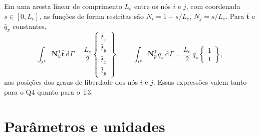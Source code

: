 \documentclass[11pt,a4paper]{article}
\newcommand{\dd}{\mathrm{d}}
\begin{document}
Em uma aresta linear de comprimento $L_e$ entre os nós $i$ e $j$, com
coordenada $s\in[0,L_e]$, as funções de forma restritas são
$N_i=1-s/L_e$, $N_j=s/L_e$. Para $\bar{\mathbf t}$ e $\bar q_\pi$ constantes,
\begin{equation*}
\int_{\Gamma^e}\mathbf N_u^{\mathsf T}\bar{\mathbf t}\,\dd\Gamma
=\frac{L_e}{2}\begin{Bmatrix}\bar t_x\\ \bar t_y\\ \bar t_x\\ \bar t_y\end{Bmatrix},
\qquad
\int_{\Gamma^e}\mathbf N_p^{\mathsf T}\bar q_\pi\,\dd\Gamma
=\frac{L_e}{2}\,\bar q_\pi\begin{Bmatrix}1\\1\end{Bmatrix},
\end{equation*}
nas posições dos graus de liberdade dos nós $i$ e $j$. Essas expressões
valem tanto para o Q4 quanto para o T3.

\section{Par\^ametros e unidades}
\end{document}
